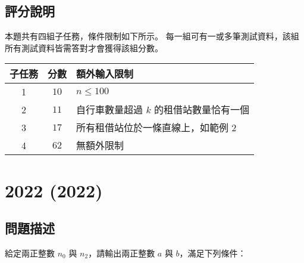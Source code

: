 \subsection{評分說明}

本題共有四組子任務，條件限制如下所示。
每一組可有一或多筆測試資料，該組所有測試資料皆需答對才會獲得該組分數。

\begin{longtable}[]{@{}ccl@{}}
\toprule
子任務 & 分數 & 額外輸入限制 \\
\midrule
\endhead
1 & \(10\) & \begin{math}n \le 100\end{math} \\
2 & \(11\) & 自行車數量超過 \begin{math}k\end{math}
的租借站數量恰有一個 \\
3 & \(17\) & 所有租借站位於一條直線上，如範例 2 \\
4 & \(62\) & 無額外限制 \\
\bottomrule
\end{longtable}

\section{2022 (2022)}

\subsection{問題描述}

給定兩正整數 \begin{math}n_0\end{math} 與
\begin{math}n_2\end{math}，請輸出兩正整數 \begin{math}a\end{math} 與
\begin{math}b\end{math}，滿足下列條件：

